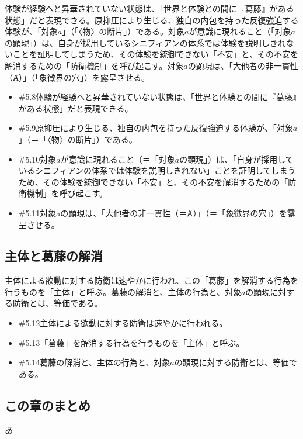 体験が経験へと昇華されていない状態は、「世界と体験との間に『葛藤』がある状態」だと表現できる。原抑圧により生じる、独自の内包を持った反復強迫する体験が、「対象\(a\)」（「〈物〉の断片」）である。対象\(a\)が意識に現れること（「対象\(a\)の顕現」）は、自身が採用しているシニフィアンの体系では体験を説明しきれないことを証明してしまうため、その体験を統御できない「不安」と、その不安を解消するための「防衛機制」を呼び起こす。対象\(a\)の顕現は、「大他者の非一貫性（Ⱥ）」（「象徴界の穴」）を露呈させる。

\begin{note}{}
  \begin{itemize}
    \tightlist
    \item{\#5.8}体験が経験へと昇華されていない状態は、「世界と体験との間に『葛藤』がある状態」だと表現できる。
    \item{\#5.9}原抑圧により生じる、独自の内包を持った反復強迫する体験が、「対象$a$」（＝「〈物〉の断片」）である。
    \item{\#5.10}対象$a$が意識に現れること（＝「対象$a$の顕現」）は、「自身が採用しているシニフィアンの体系では体験を説明しきれない」ことを証明してしまうため、その体験を統御できない「不安」と、その不安を解消するための「防衛機制」を呼び起こす。
    \item{\#5.11}対象aの顕現は、「大他者の非一貫性（＝Ⱥ）」（＝「象徴界の穴」）を露呈させる。
  \end{itemize}
\end{note}

\subsection{主体と葛藤の解消}\label{ux4e3bux4f53ux3068ux845bux85e4ux306eux89e3ux6d88}

主体による欲動に対する防衛は速やかに行われ、この「葛藤」を解消する行為を行うものを「主体」と呼ぶ。葛藤の解消と、主体の行為と、対象\(a\)の顕現に対する防衛とは、等価である。

\begin{note}{}
  \begin{itemize}
    \tightlist
    \item{\#5.12}主体による欲動に対する防衛は速やかに行われる。
    \item{\#5.13}「葛藤」を解消する行為を行うものを「主体」と呼ぶ。
    \item{\#5.14}葛藤の解消と、主体の行為と、対象$a$の顕現に対する防衛とは、等価である。
  \end{itemize}
\end{note}

\subsection{この章のまとめ}\label{ux3053ux306eux7ae0ux306eux307eux3068ux3081}

あ

